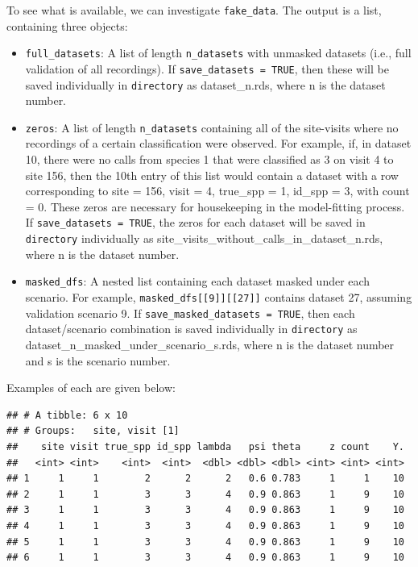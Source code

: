 \documentclass[
]{article}
\newenvironment{Shaded}{\begin{snugshade}}{\end{snugshade}}
\newcommand{\DecValTok}[1]{\textcolor[rgb]{0.00,0.00,0.81}{#1}}
\newcommand{\FunctionTok}[1]{\textcolor[rgb]{0.13,0.29,0.53}{\textbf{#1}}}
\newcommand{\NormalTok}[1]{#1}
\newcommand{\OtherTok}[1]{\textcolor[rgb]{0.56,0.35,0.01}{#1}}
\newcommand{\SpecialCharTok}[1]{\textcolor[rgb]{0.81,0.36,0.00}{\textbf{#1}}}
\providecommand{\tightlist}{%
  \setlength{\itemsep}{0pt}\setlength{\parskip}{0pt}}
\begin{document}
\linespread{1}

To see what is available, we can investigate \texttt{fake\_data}. The output is a list, containing three objects:

\begin{itemize}
\tightlist
\item
  \texttt{full\_datasets}: A list of length \texttt{n\_datasets} with unmasked datasets (i.e., full validation of all recordings). If \texttt{save\_datasets\ =\ TRUE}, then these will be saved individually in \texttt{directory} as dataset\_n.rds, where n is the dataset number.
\item
  \texttt{zeros}: A list of length \texttt{n\_datasets} containing all of the site-visits where no recordings of a certain classification were observed. For example, if, in dataset 10, there were no calls from species 1 that were classified as 3 on visit 4 to site 156, then the 10th entry of this list would contain a dataset with a row corresponding to site = 156, visit = 4, true\_spp = 1, id\_spp = 3, with count = 0. These zeros are necessary for housekeeping in the model-fitting process. If \texttt{save\_datasets\ =\ TRUE}, the zeros for each dataset will be saved in \texttt{directory} individually as site\_visits\_without\_calls\_in\_dataset\_n.rds, where n is the dataset number.
\item
  \texttt{masked\_dfs}: A nested list containing each dataset masked under each scenario. For example, \texttt{masked\_dfs{[}{[}9{]}{]}{[}{[}27{]}{]}} contains dataset 27, assuming validation scenario 9. If \texttt{save\_masked\_datasets\ =\ TRUE}, then each dataset/scenario combination is saved individually in \texttt{directory} as dataset\_n\_masked\_under\_scenario\_s.rds, where n is the dataset number and s is the scenario number.
\end{itemize}

Examples of each are given below:

\linespread{1}

\begin{Shaded}
\end{Shaded}

\begin{verbatim}
## # A tibble: 6 x 10
## # Groups:   site, visit [1]
##    site visit true_spp id_spp lambda   psi theta     z count    Y.
##   <int> <int>    <int>  <int>  <dbl> <dbl> <dbl> <int> <int> <int>
## 1     1     1        2      2      2   0.6 0.783     1     1    10
## 2     1     1        3      3      4   0.9 0.863     1     9    10
## 3     1     1        3      3      4   0.9 0.863     1     9    10
## 4     1     1        3      3      4   0.9 0.863     1     9    10
## 5     1     1        3      3      4   0.9 0.863     1     9    10
## 6     1     1        3      3      4   0.9 0.863     1     9    10
\end{verbatim}
\end{document}
